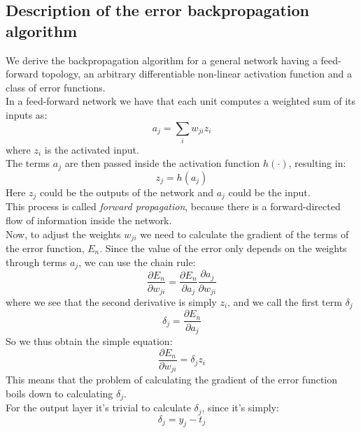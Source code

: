 \documentclass[12pt]{article}
\begin{document}
\subsection{Description of the error backpropagation algorithm}
We derive the backpropagation algorithm for a general network having a feed-forward topology, an 
arbitrary differentiable non-linear activation function and a class of error functions. \\
In a feed-forward network we have that each unit computes a weighted sum of its inputs as:
\begin{equation}
  a_j = \sum_i w_{ji}z_i
\end{equation}
where $z_i$ is the activated input. \\
The terms $a_j$ are then passed inside the activation function $h(\cdot)$, resulting in:
\begin{equation}
  z_j = h(a_j)
\end{equation}
Here $z_j$ could be the outputs of the network and $a_j$ could be the input. \\
This process is called \textit{forward propagation}, because there is a forward-directed flow of
information inside the network. \\
Now, to adjust the weights $w_{ji}$ we need to calculate the gradient of the terms of the error  
function, $E_n$. Since the value of the error only depends on the weights through terms $a_j$, we 
can use the chain rule:
\begin{equation}
  \frac{\partial E_n}{\partial w_{ji}} = 
  \frac{\partial E_n}{\partial a_{j}}\frac{\partial a_j}{\partial w_{ji}}
\end{equation}
where we see that the second derivative is simply $z_i$, and we call the first term $\delta_j$
\begin{equation}
  \delta_j = \frac{\partial E_n}{\partial a_j}
\end{equation}
So we thus obtain the simple equation:
\begin{equation}
  \frac{\partial E_n}{\partial w_{ji}} = \delta_j z_i
  \label{loss_gradient_weight}
\end{equation}
This means that the problem of calculating the gradient of the error function boils down to
calculating $\delta_j$. \\
For the output layer it's trivial to calculate $\delta_j$, since it's simply:
\begin{equation}
  \delta_j = y_j - t_j
  \label{output_delta}
\end{equation}
\end{document}
